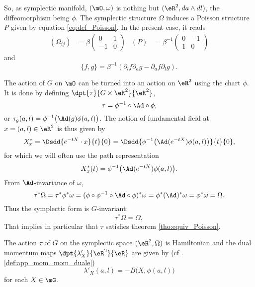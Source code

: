 So, as symplectic manifold, $(\mO,\omega)$ is nothing but $(\eR^2,da\wedge dl)$, the diffeomorphism being $\phi$. The symplectic structure $\Omega$ induces a Poisson structure $P$ given by equation \eqref{eq:def_Poisson}. In the present case, it reads
\begin{align}
(\Omega_{ij})&=\beta\begin{pmatrix}
0 & 1 \\
-1 & 0
\end{pmatrix}
&(P)&=\beta^{-1}\begin{pmatrix}
0 & -1 \\
1 & 0
\end{pmatrix}
\end{align}
 and
\begin{equation}\label{eq:Poisson}
  \{f,g\}=\beta^{-1}(\partial_lf\partial_ag-\partial_af\partial_lg).
\end{equation}

The action of $G$ on $\mO$ can be turned into an action on $\eR^2$ using the chart $\phi$. It is done by defining $\dpt{\tau}{G\times\eR^2}{\eR^2}$,
\begin{equation}
   \tau=\phi^{-1}\circ \Ad\circ\phi,
\end{equation}
or $\tau_g(a,l)=\phi^{-1}\big( \Ad(g)\phi(a,l)\big)$.  The notion of fundamental field at $x=(a,l)\in\eR^2$ is thus given by
\begin{equation}
  X^*_x=\Dsdd{e^{-tX}\cdot x}{t}{0}
       =\Dsdd{ \phi^{-1}\big( \Ad(e^{-tX})\phi(a,l)  \big) }{t}{0},
\end{equation}
for which we will often use the path representation
\[
   X^*_x(t)=\phi^{-1}\big( \Ad(e^{-tX})\phi(a,l)  \big).
\]
From $\Ad$-invariance of $\omega$,
\[
   \tau^*\Omega=\tau^*\phi^*\omega
               =(\phi\circ\phi^{-1}\circ \Ad\circ\phi)^*\omega
           =\phi^*(\Ad)^*\omega
           =\phi^*\omega
           =\Omega.
\]
Thus the symplectic form is $G$-invariant:
\begin{equation}     \label{eq:tau_s_Omega}
  \tau^*\Omega=\Omega,
\end{equation}
That implies in particular that $\tau$ satisfies theorem \ref{tho:equiv_Poisson}.

\begin{proposition}
The action $\tau$ of $G$ on the symplectic space $(\eR^2,\Omega)$ is Hamiltonian and the dual momentum maps $\dpt{\lambda'_X}{\eR^2}{\eR}$ are given by (cf .\ref{def:app_mom_mom_duale})
\begin{equation}
  \lambda'_X(a,l)=-B\big(X,\phi(a,l)\big)
\end{equation}
for each $X\in\mG$.
\label{prop:lambda_X}
\end{proposition}


